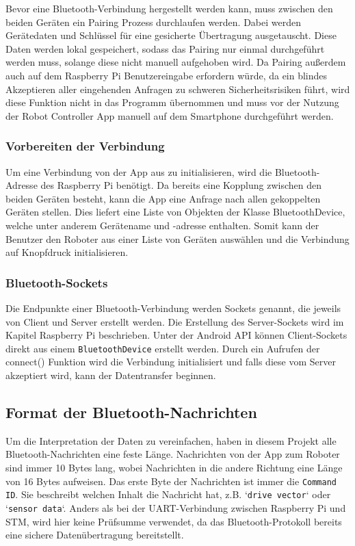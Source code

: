 \documentclass[12pt, a4paper]{report}
\begin{document}
Bevor eine Bluetooth-Verbindung hergestellt werden kann, muss zwischen den beiden Geräten ein Pairing Prozess durchlaufen werden. Dabei werden Gerätedaten und Schlüssel für eine gesicherte Übertragung ausgetauscht. Diese Daten werden lokal gespeichert, sodass das Pairing nur einmal durchgeführt werden muss, solange diese nicht manuell aufgehoben wird. Da Pairing außerdem auch auf dem Raspberry Pi Benutzereingabe erfordern würde, da ein blindes Akzeptieren aller eingehenden Anfragen zu schweren Sicherheitsrisiken führt, wird diese Funktion nicht in das Programm übernommen und muss vor der Nutzung der Robot Controller App manuell auf dem Smartphone durchgeführt werden.


\newpage
\subsubsection{Vorbereiten der Verbindung}

Um eine Verbindung von der App aus zu initialisieren, wird die Bluetooth-Adresse des Raspberry Pi benötigt. Da bereits eine Kopplung zwischen den beiden Geräten besteht, kann die App eine Anfrage nach allen gekoppelten Geräten stellen. Dies liefert eine Liste von Objekten der Klasse BluetoothDevice, welche unter anderem Gerätename und -adresse enthalten. Somit kann der Benutzer den Roboter aus einer Liste von Geräten auswählen und die Verbindung auf Knopfdruck initialisieren.


\subsubsection{Bluetooth-Sockets}

Die Endpunkte einer Bluetooth-Verbindung werden Sockets genannt, die jeweils von Client und Server erstellt werden. Die Erstellung des Server-Sockets wird im Kapitel Raspberry Pi beschrieben. Unter der Android API können Client-Sockets direkt aus einem \texttt{BluetoothDevice} erstellt werden. Durch ein Aufrufen der connect() Funktion wird die Verbindung initialisiert und falls diese vom Server akzeptiert wird, kann der Datentransfer beginnen.


\subsection{Format der Bluetooth-Nachrichten}

Um die Interpretation der Daten zu vereinfachen, haben in diesem Projekt alle Bluetooth-Nachrichten eine feste Länge. Nachrichten von der App zum Roboter sind immer 10 Bytes lang, wobei Nachrichten in die andere Richtung eine Länge von 16 Bytes aufweisen. Das erste Byte der Nachrichten ist immer die \texttt{Command ID}. Sie beschreibt welchen Inhalt die Nachricht hat, z.B. `\texttt{drive vector}` oder `\texttt{sensor data}`. Anders als bei der UART-Verbindung zwischen Raspberry Pi und STM, wird hier keine Prüfsumme verwendet, da das Bluetooth-Protokoll bereits eine sichere Datenübertragung bereitstellt.
\end{document}
